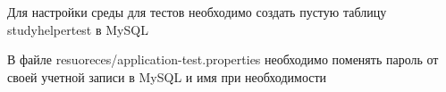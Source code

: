 
\begin{DoxyItemize}
\item Для настройки среды для тестов необходимо создать пустую таблицу studyhelpertest в My\+S\+QL
\item В файле resuoreces/application-\/test.\+properties необходимо поменять пароль от своей учетной записи в My\+S\+QL и имя при необходимости 
\end{DoxyItemize}